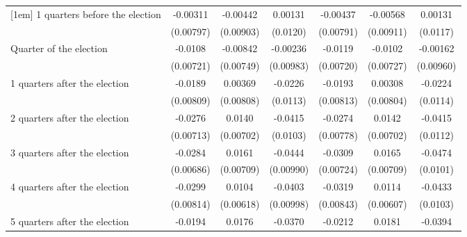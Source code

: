 \begin{table}[htbp]
\begin{tabular}{l*{6}{c}}
[1em]
 1 quarters before the election&    -0.00311         &    -0.00442         &     0.00131         &    -0.00437         &    -0.00568         &     0.00131         \\
                    &   (0.00797)         &   (0.00903)         &    (0.0120)         &   (0.00791)         &   (0.00911)         &    (0.0117)         \\
[1em]
Quarter of the election&     -0.0108         &    -0.00842         &    -0.00236         &     -0.0119         &     -0.0102         &    -0.00162         \\
                    &   (0.00721)         &   (0.00749)         &   (0.00983)         &   (0.00720)         &   (0.00727)         &   (0.00960)         \\
[1em]
 1 quarters after the election&     -0.0189\sym{*}  &     0.00369         &     -0.0226\sym{*}  &     -0.0193\sym{*}  &     0.00308         &     -0.0224\sym{*}  \\
                    &   (0.00809)         &   (0.00808)         &    (0.0113)         &   (0.00813)         &   (0.00804)         &    (0.0114)         \\
[1em]
 2 quarters after the election&     -0.0276\sym{***}&      0.0140\sym{*}  &     -0.0415\sym{***}&     -0.0274\sym{***}&      0.0142\sym{*}  &     -0.0415\sym{***}\\
                    &   (0.00713)         &   (0.00702)         &    (0.0103)         &   (0.00778)         &   (0.00702)         &    (0.0112)         \\
[1em]
 3 quarters after the election&     -0.0284\sym{***}&      0.0161\sym{*}  &     -0.0444\sym{***}&     -0.0309\sym{***}&      0.0165\sym{*}  &     -0.0474\sym{***}\\
                    &   (0.00686)         &   (0.00709)         &   (0.00990)         &   (0.00724)         &   (0.00709)         &    (0.0101)         \\
[1em]
 4 quarters after the election&     -0.0299\sym{***}&      0.0104         &     -0.0403\sym{***}&     -0.0319\sym{***}&      0.0114         &     -0.0433\sym{***}\\
                    &   (0.00814)         &   (0.00618)         &   (0.00998)         &   (0.00843)         &   (0.00607)         &    (0.0103)         \\
[1em]
 5 quarters after the election&     -0.0194\sym{**} &      0.0176         &     -0.0370\sym{**} &     -0.0212\sym{**} &      0.0181         &     -0.0394\sym{**} \\

\end{tabular}
\end{table}
